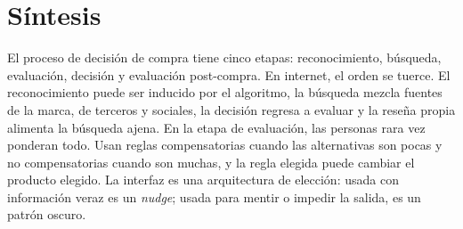 \section{Síntesis}

El proceso de decisión de compra tiene cinco etapas: reconocimiento,
búsqueda, evaluación, decisión y evaluación post-compra. En internet, el
orden se tuerce. El reconocimiento puede ser inducido por el algoritmo, la
búsqueda mezcla fuentes de la marca, de terceros y sociales, la decisión
regresa a evaluar y la reseña propia alimenta la búsqueda ajena. En la etapa
de evaluación, las personas rara vez ponderan todo. Usan reglas compensatorias
cuando las alternativas son pocas y no compensatorias cuando son muchas, y la
regla elegida puede cambiar el producto elegido. La interfaz es una
arquitectura de elección: usada con información veraz es un \textit{nudge};
usada para mentir o impedir la salida, es un patrón oscuro.

